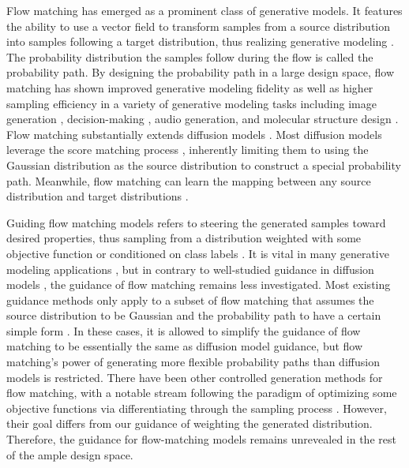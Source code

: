 







Flow matching has emerged as a prominent class of generative models. It features the ability to use a vector field to transform samples from a source distribution into samples following a target distribution, thus realizing generative modeling \citep{lipman_flow_2023}. The probability distribution the samples follow during the flow is called the probability path. By designing the probability path in a large design space, flow matching has shown improved generative modeling fidelity as well as higher sampling efficiency in a variety of generative modeling tasks including image generation \citep{lipman_flow_2023}, decision-making \citep{zheng_guided_2023}, audio generation, and molecular structure design \citep{gat_discrete_2024,chen_flow_2024,ben-hamu_d-flow_2024}. Flow matching substantially extends diffusion models \citep{ho_denoising_2020,song_score-based_2021}. Most diffusion models leverage the score matching process \citep{song_generative_2019,song_sliced_2020,song_score-based_2021}, inherently limiting them to using the Gaussian distribution as the source distribution to construct a special probability path. Meanwhile, flow matching can learn the mapping between any source distribution and target distributions \citep{lipman_flow_2023,lipman_flow_2024,chen_flow_2024,gat_discrete_2024}.

Guiding flow matching models refers to steering the generated samples toward desired properties, thus sampling from a distribution weighted with some objective function \citep{lu_contrastive_nodate} or conditioned on class labels \citep{song_score-based_2021}. It is vital in many generative modeling applications \citep{song_loss-guided_2023,zheng_guided_2023}, but in contrary to well-studied guidance in diffusion models \citep{song_loss-guided_2023,chung_diffusion_2024,dhariwal_diffusion_2021,song_pseudoinverse-guided_2022,zheng_ensemble_2024,lu_contrastive_nodate,dou_diffusion_2023,trippe_diffusion_2023}, the guidance of flow matching remains less investigated. Most existing guidance methods only apply to a subset of flow matching that assumes the source distribution to be Gaussian and the probability path to have a certain simple form \citep{lipman_flow_2024,zheng_guided_2023,pokle_training-free_2024,anonymous2025energyweighted,anonymous2025flow}. In these cases, it is allowed to simplify the guidance of flow matching to be essentially the same as diffusion model guidance, but flow matching's power of generating more flexible probability paths than diffusion models \citep{tong_improving_2024,chen_flow_2024,gat_discrete_2024} is restricted. 
There have been other controlled generation methods for flow matching, with a notable stream following the paradigm of optimizing some objective functions via differentiating through the sampling process \citep{ben-hamu_d-flow_2024,liu_flowgrad_2023,anonymous2025training}. However, their goal differs from our guidance of weighting the generated distribution.
Therefore, the guidance for flow-matching models remains unrevealed in the rest of the ample design space. 

